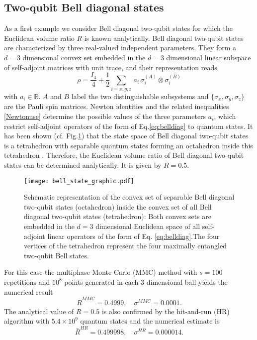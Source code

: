\documentclass[12pt]{iopart}
\begin{document}
\subsection{Two-qubit Bell diagonal states}\label{sec:bell-dia}

As a first example we consider Bell diagonal two-qubit states for which the Euclidean volume ratio $R$ is known analytically.
Bell diagonal two-qubit states are characterized by three real-valued independent parameters. They form a $d=3$ dimensional convex set embedded in the $d=3$ dimensional linear subspace of self-adjoint 
matrices with unit trace, and their representation reads
\begin{equation}
    \rho = \frac{I_4}{4}+\frac{1}{2}\sum_{i=x,y,z}\,a_i\,\sigma^{(A)}_i\otimes
    \sigma^{(B)}_i 
    \label{eq:belldiag}
\end{equation}
with $a_i \in \mathbb{R}$.
$A$ and $B$ label the two distinguishable subsystems and $\{\sigma_x, \sigma_y, \sigma_z \}$ are the Pauli spin matrices. 
Newton identities and the related inequalities \eqref{Newtonuse} determine the possible values of the three parameters $a_i$, which restrict self-adjoint operators of the form of Eq.\eqref{eq:belldiag} 
to quantum states. It has been shown (cf. Fig.\ref{Belldiagonal}) that the state space of Bell diagonal two-qubit states is a tetrahedron with separable quantum states forming an octahedron inside this tetrahedron  \cite{Ziman, LeMyOv06}. Therefore, the Euclidean volume ratio of Bell diagonal two-qubit states can be determined analytically. It is given by $R=0.5$.
\begin{figure}
   \centering
  \texttt{[image: bell\_state\_graphic.pdf]}
     \caption{Schematic representation of the convex set of separable Bell diagonal two-qubit states (octahedron) inside  the convex set of all Bell diagonal two-qubit states (tetrahedron): 
     Both convex sets are embedded in the $d=3$ dimensional Euclidean space of all self-adjoint linear operators of the form of Eq. \eqref{eq:belldiag}.The four vertices of the tetrahedron represent the four maximally entangled two-qubit Bell states.}
   \label{Belldiagonal}
 \end{figure}
For this case the multiphase Monte Carlo (MMC) method with $s=100$ repetitions and $10^8$ points generated in each $3$ dimensional ball yields the numerical result
\begin{equation}
 \bar{R}^{MMC}=0.4999, \quad \sigma^{MMC}=0.0001. 
\end{equation}
The analytical value of $R = 0.5$ is also confirmed by the hit-and-run (HR) algorithm with $5.4 \times 10^9$ quantum states and the numerical estimate is
\begin{equation}
 \bar{R}^{HR}=0.499998, \quad \sigma^{HR}=0.000014. 
\end{equation}
\end{document}
